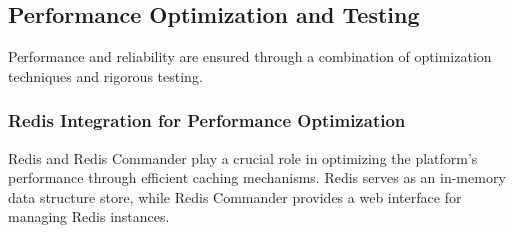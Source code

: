 





\subsection{Performance Optimization and Testing}
\noindent
Performance and reliability are ensured through a combination of optimization techniques and rigorous testing.

\subsubsection{Redis Integration for Performance Optimization}
\noindent
Redis and Redis Commander play a crucial role in optimizing the platform's performance through efficient caching mechanisms. Redis serves as an in-memory data structure store, while Redis Commander provides a web interface for managing Redis instances.

